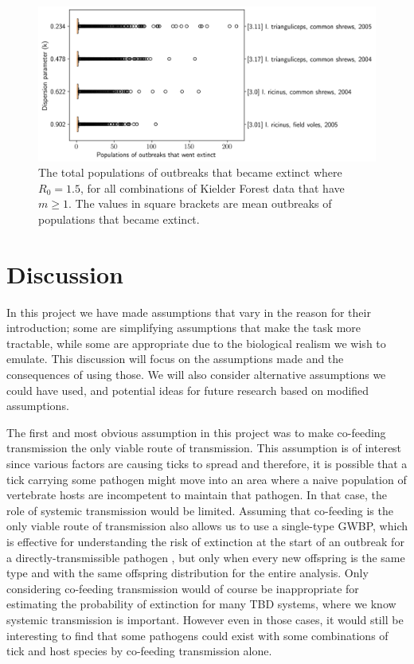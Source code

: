 \documentclass{article}
\begin{document}
\begin{figure}[]
	\begin{mdframed}[backgroundcolor=grey250,rightline=false,leftline=false,topline=false]
		\centering
		\includegraphics[width=.73\linewidth,valign=m]{allCombinations_populationsOfOutbreaksThatWentExtinct}
		\caption{The total populations of outbreaks that became extinct where $ R_0 = 1.5 $, for all combinations of Kielder Forest data that have $ m \ge 1 $. The values in square brackets are mean outbreaks of populations that became extinct.}
		\label{fig:allCombinations_populationsOfOutbreaksThatWentExtinct}
	\end{mdframed}
\end{figure}

\clearpage
\newpage

\section{Discussion}

In this project we have made assumptions that vary in the reason for their introduction; some are simplifying assumptions that make the task more tractable, while some are appropriate due to the biological realism we wish to emulate. This discussion will focus on the assumptions made and the consequences of using those. We will also consider alternative assumptions we could have used, and potential ideas for future research based on modified assumptions.

The first and most obvious assumption in this project was to make co-feeding transmission the only viable route of transmission. This assumption is of interest since various factors are causing ticks to spread \cite{} and therefore, it is possible that a tick carrying some pathogen might move into an area where a naive population of vertebrate hosts are incompetent to maintain that pathogen. In that case, the role of systemic transmission would be limited. Assuming that co-feeding is the only viable route of transmission also allows us to use a single-type GWBP, which is effective for understanding the risk of extinction at the start of an outbreak for a directly-transmissible pathogen \cite{}, but only when every new offspring is the same type and with the same offspring distribution for the entire analysis. Only considering co-feeding transmission would of course be inappropriate for estimating the probability of extinction for many TBD systems, where we know systemic transmission is important. However even in those cases, it would still be interesting to find that some pathogens could exist with some combinations of tick and host species by co-feeding transmission alone.
\end{document}
